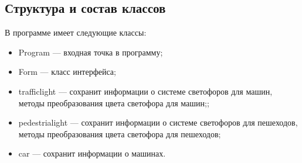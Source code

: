 \subsection{Структура и состав классов}

В программе имеет следующие классы:
\begin{itemize}[label = ---]
    \item Program --- входная точка в программу; 
    \item Form --- класс интерфейса;
    \item trafficlight --- сохранит информации о системе светофоров для машин, методы преобразования цвета светофора для машин;;
    \item pedestrialight --- сохранит информации о системе светофоров для пешеходов, методы преобразования цвета светофора для пешеходов;
    \item car --- сохранит информации о машинах.
\end{itemize}